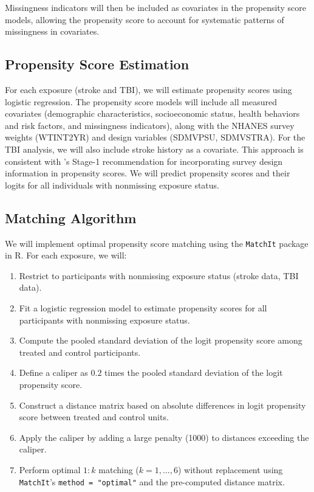 \documentclass{article}
\begin{document}
Missingness indicators will then be included as covariates in the propensity score models, allowing the propensity score to account for systematic patterns of missingness in covariates.

\subsection{Propensity Score Estimation}

For each exposure (stroke and TBI), we will estimate propensity scores using logistic regression. The propensity score models will include all measured covariates (demographic characteristics, socioeconomic status, health behaviors and risk factors, and missingness indicators), along with the NHANES survey weights (WTINT2YR) and design variables (SDMVPSU, SDMVSTRA). For the TBI analysis, we will also include stroke history as a covariate. This approach is consistent with \citet{dugoff2014}'s Stage-1 recommendation for incorporating survey design information in propensity scores. We will predict propensity scores and their logits for all individuals with nonmissing exposure status.

\subsection{Matching Algorithm}

We will implement optimal propensity score matching using the \texttt{MatchIt} package in R. For each exposure, we will:

\begin{enumerate}
    \item Restrict to participants with nonmissing exposure status (stroke data, TBI data).

    \item Fit a logistic regression model to estimate propensity scores for all participants with nonmissing exposure status.

    \item Compute the pooled standard deviation of the logit propensity score among treated and control participants.

    \item Define a caliper as $0.2$ times the pooled standard deviation of the logit propensity score.

    \item Construct a distance matrix based on absolute differences in logit propensity score between treated and control units.

    \item Apply the caliper by adding a large penalty (1000) to distances exceeding the caliper.

    \item Perform optimal $1\!:\!k$ matching ($k = 1,\dots,6$) without replacement using \texttt{MatchIt}'s \texttt{method = "optimal"} and the pre-computed distance matrix.

\end{enumerate}
\end{document}
